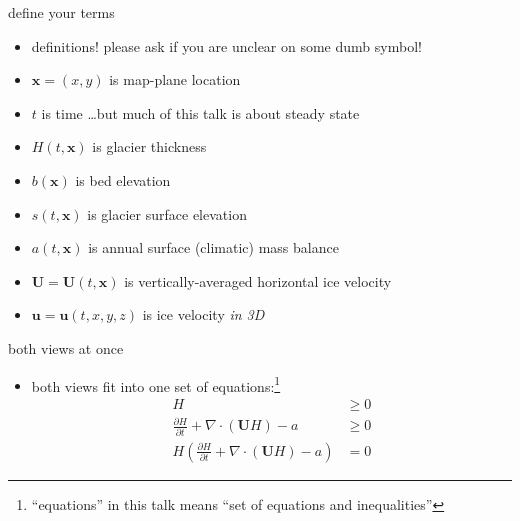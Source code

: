 \documentclass[10pt,hyperref,dvipsnames]{beamer}
\newcommand{\bx}{\mathbf{x}}
\newcommand{\bu}{\mathbf{u}}
\newcommand{\bU}{\mathbf{U}}
\newcommand{\Div}{\nabla\cdot}
\begin{document}
\begin{frame}{define your terms}
\begin{itemize}
\item definitions!  please ask if you are unclear on some dumb symbol!

\bigskip
\item $\bx = (x,y)$ is map-plane location
\item $t$ is time \dots but much of this talk is about steady state

\medskip
\item $H(t,\bx)$ is glacier thickness
\item $b(\bx)$ is bed elevation
\item $s(t,\bx)$ is glacier surface elevation
\item $a(t,\bx)$ is annual surface (climatic) mass balance
\item $\bU = \bU(t,\bx)$ is vertically-averaged horizontal ice velocity
\item $\bu = \bu(t,x,y,z)$ is ice velocity \emph{in 3D}
\end{itemize}
\end{frame}


\begin{frame}{both views at once}
\begin{itemize}
\item both views fit into one set of equations:\footnote{``equations'' in this talk means ``set of equations and inequalities''}
\begin{align*}
H &\ge 0 \\
\frac{\partial H}{\partial t} + \Div \left(\bU H\right) - a &\ge 0 \\
H \left(\frac{\partial H}{\partial t} + \Div \left(\bU H\right) - a\right) &= 0
\end{align*}
\end{itemize}
\end{frame}
\end{document}
